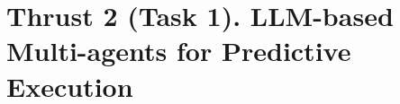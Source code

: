 \section{Thrust 2 (Task 1). LLM-based Multi-agents for Predictive Execution}
\label{sec:thrust2}






